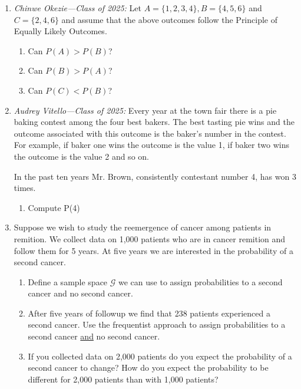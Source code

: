 \begin{enumerate}
    \item \textit{Chinwe Okezie---Class of 2025:} Let $A = \{1,2,3,4\}, B=\{4,5,6\}$ and $C = \{2,4,6\}$ and assume that the above outcomes follow the Principle of Equally Likely Outcomes.
    \begin{enumerate}
        \item Can $P(A) > P(B)$?
        \item Can $P(B) > P(A)$?
        \item Can $P(C) < P(B)$?
    \end{enumerate}
    
    \item \textit{Audrey Vitello---Class of 2025:} Every year at the town fair there is a pie baking contest among the four best bakers. The best tasting pie wins and the outcome associated with this outcome is the baker’s number in the contest. For example, if baker one wins the outcome is the value 1, if baker two wins the outcome is the value 2 and so on.
    
    In the past ten years Mr. Brown, consistently contestant number 4, has won 3 times.
    \begin{enumerate}
        \item Compute P(4)
    \end{enumerate}
    
    \item Suppose we wish to study the reemergence of cancer among patients in remition. We collect data on 1,000 patients who are in cancer remition and follow them for 5 years. At five years we are interested in the probability of a second cancer. 
    \begin{enumerate}
        \item Define a sample space $\mathcal{G}$ we can use to assign probabilities to a second cancer and no second cancer. 
        \item After five years of followup we find that 238 patients experienced a second cancer. Use the frequentist approach to assign probabilities to a second cancer \underline{and} no second cancer.
        \item If you collected data on 2,000 patients do you expect the probability of a second cancer to change? How do you expect the probability to be different for 2,000 patients than with 1,000 patients? 
    \end{enumerate}
    

\end{enumerate}

